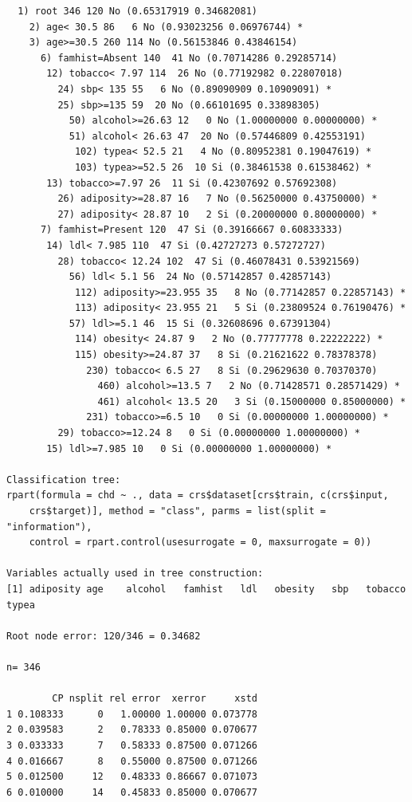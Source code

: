 \documentclass[11pt,a4paper]{report}
\begin{document}
\begin{itemize}
\begin{verbatim}
  1) root 346 120 No (0.65317919 0.34682081)  
    2) age< 30.5 86   6 No (0.93023256 0.06976744) *
    3) age>=30.5 260 114 No (0.56153846 0.43846154)  
      6) famhist=Absent 140  41 No (0.70714286 0.29285714)  
       12) tobacco< 7.97 114  26 No (0.77192982 0.22807018)  
         24) sbp< 135 55   6 No (0.89090909 0.10909091) *
         25) sbp>=135 59  20 No (0.66101695 0.33898305)  
           50) alcohol>=26.63 12   0 No (1.00000000 0.00000000) *
           51) alcohol< 26.63 47  20 No (0.57446809 0.42553191)  
            102) typea< 52.5 21   4 No (0.80952381 0.19047619) *
            103) typea>=52.5 26  10 Si (0.38461538 0.61538462) *
       13) tobacco>=7.97 26  11 Si (0.42307692 0.57692308)  
         26) adiposity>=28.87 16   7 No (0.56250000 0.43750000) *
         27) adiposity< 28.87 10   2 Si (0.20000000 0.80000000) *
      7) famhist=Present 120  47 Si (0.39166667 0.60833333)  
       14) ldl< 7.985 110  47 Si (0.42727273 0.57272727)  
         28) tobacco< 12.24 102  47 Si (0.46078431 0.53921569)  
           56) ldl< 5.1 56  24 No (0.57142857 0.42857143)  
            112) adiposity>=23.955 35   8 No (0.77142857 0.22857143) *
            113) adiposity< 23.955 21   5 Si (0.23809524 0.76190476) *
           57) ldl>=5.1 46  15 Si (0.32608696 0.67391304)  
            114) obesity< 24.87 9   2 No (0.77777778 0.22222222) *
            115) obesity>=24.87 37   8 Si (0.21621622 0.78378378)  
              230) tobacco< 6.5 27   8 Si (0.29629630 0.70370370)  
                460) alcohol>=13.5 7   2 No (0.71428571 0.28571429) *
                461) alcohol< 13.5 20   3 Si (0.15000000 0.85000000) *
              231) tobacco>=6.5 10   0 Si (0.00000000 1.00000000) *
         29) tobacco>=12.24 8   0 Si (0.00000000 1.00000000) *
       15) ldl>=7.985 10   0 Si (0.00000000 1.00000000) *

Classification tree:
rpart(formula = chd ~ ., data = crs$dataset[crs$train, c(crs$input, 
    crs$target)], method = "class", parms = list(split = "information"), 
    control = rpart.control(usesurrogate = 0, maxsurrogate = 0))

Variables actually used in tree construction:
[1] adiposity age    alcohol   famhist   ldl   obesity   sbp   tobacco   typea    

Root node error: 120/346 = 0.34682

n= 346 

        CP nsplit rel error  xerror     xstd
1 0.108333      0   1.00000 1.00000 0.073778
2 0.039583      2   0.78333 0.85000 0.070677
3 0.033333      7   0.58333 0.87500 0.071266
4 0.016667      8   0.55000 0.87500 0.071266
5 0.012500     12   0.48333 0.86667 0.071073
6 0.010000     14   0.45833 0.85000 0.070677


\end{verbatim}
\end{itemize}
\end{document}
